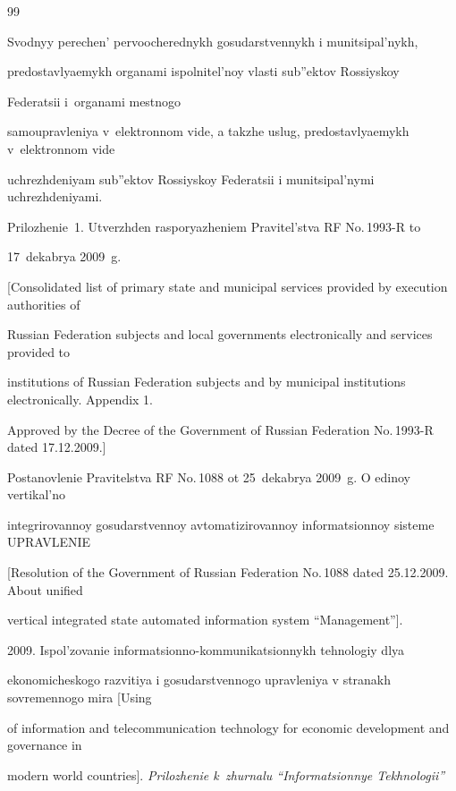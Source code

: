 {{\begin{thebibliography}{99}

Svodnyy perechen' pervoocherednykh gosudarstvennykh i munitsipal'nykh,

predostav\-lyaemykh organami ispolnitel'noy vlasti sub''ektov Rossiyskoy

Federatsii i~\mbox{organami} mestnogo

samoupravleniya v~elektronnom vide, a takzhe uslug, pre\-dostav\-lya\-emykh v~elektronnom vide

uchrezhdeniyam sub''ektov Rossiyskoy Federatsii i munitsipal'nymi uchrezhdeniyami.

Prilozhenie~1. Utverzhden rasporyazheniem Pravitel'stva RF No.\,1993-R to

17~dekabrya 2009~g.

[Consolidated list of primary state and municipal services provided by execution authorities of

Russian Federation subjects and local governments electronically and services provided to

institutions of Russian Federation subjects and by municipal institutions electronically. Appendix 1.

Approved by the Decree of the Government of Russian Federation No.\,1993-R dated 17.12.2009.]




Postanovlenie Pravitelstva RF No.\,1088 ot 25~dekabrya 2009~g. O edinoy vertikal'no

integrirovannoy gosudarstvennoy avtomatizirovannoy informatsionnoy sisteme UPRAVLENIE

[Resolution of the Government of Russian Federation No.\,1088 dated 25.12.2009. About unified

vertical integrated state automated information system ``Management''].






 2009. Ispol'zovanie informatsionno-kommunikatsionnykh tehnologiy dlya

ekonomicheskogo razvitiya i gosudarstvennogo upravleniya v stranakh sovremennogo mira [Using

of information and telecommunication technology for economic development and governance in

modern world countries]. \textit{Prilozhenie k~zhurnalu ``Informatsionnye Tekhnologii''}


\end{thebibliography}}}
